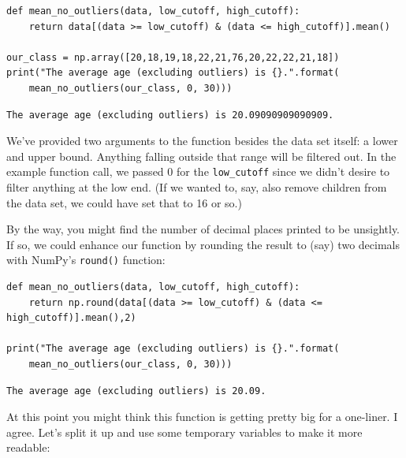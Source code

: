 \begin{Verbatim}[fontsize=\small,samepage=true,frame=single,framesep=3mm]
def mean_no_outliers(data, low_cutoff, high_cutoff):
    return data[(data >= low_cutoff) & (data <= high_cutoff)].mean()

our_class = np.array([20,18,19,18,22,21,76,20,22,22,21,18])
print("The average age (excluding outliers) is {}.".format(
    mean_no_outliers(our_class, 0, 30)))
\end{Verbatim}

\vspace{-.2in}

\begin{Verbatim}[fontsize=\small,samepage=true,frame=leftline,framesep=5mm,framerule=1mm]
The average age (excluding outliers) is 20.09090909090909.
\end{Verbatim}

We've provided two arguments to the function besides the data set itself: a
lower and upper bound. Anything falling outside that range will be filtered
out. In the example function call, we passed 0 for the \texttt{low\_cutoff}
since we didn't desire to filter anything at the low end. (If we wanted to,
say, also remove children from the data set, we could have set that to 16 or
so.)

By the way, you might find the number of decimal places printed to be
unsightly. If so, we could enhance our function by rounding the result to (say)
two decimals with NumPy's \texttt{round()} function:


\begin{Verbatim}[fontsize=\footnotesize,samepage=true,frame=single,framesep=3mm]
def mean_no_outliers(data, low_cutoff, high_cutoff):
    return np.round(data[(data >= low_cutoff) & (data <= high_cutoff)].mean(),2)

print("The average age (excluding outliers) is {}.".format(
    mean_no_outliers(our_class, 0, 30)))
\end{Verbatim}
\vspace{-.2in}

\begin{Verbatim}[fontsize=\small,samepage=true,frame=leftline,framesep=5mm,framerule=1mm]
The average age (excluding outliers) is 20.09.
\end{Verbatim}

At this point you might think this function is getting pretty big for a
one-liner. I agree. Let's split it up and use some temporary variables to make
it more readable:

